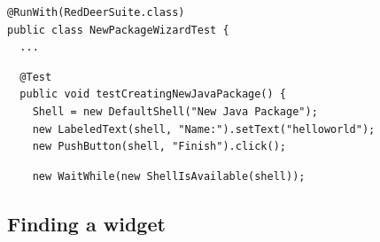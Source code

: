 \documentclass{beamer}
\begin{document}
\begin{frame}[fragile]
\begin{lstlisting}
@RunWith(RedDeerSuite.class)
public class NewPackageWizardTest {
  ...
\end{lstlisting}
\pause
\begin{lstlisting}
  @Test
  public void testCreatingNewJavaPackage() {    
    Shell = new DefaultShell("New Java Package");
    new LabeledText(shell, "Name:").setText("helloworld");
    new PushButton(shell, "Finish").click();
\end{lstlisting}
\pause
\begin{lstlisting}
    new WaitWhile(new ShellIsAvailable(shell));
\end{lstlisting}
\end{frame}


\subsection{Finding a widget}

\begin{frame}[fragile]
\begin{center}
\end{center}
\end{frame}
\end{document}
